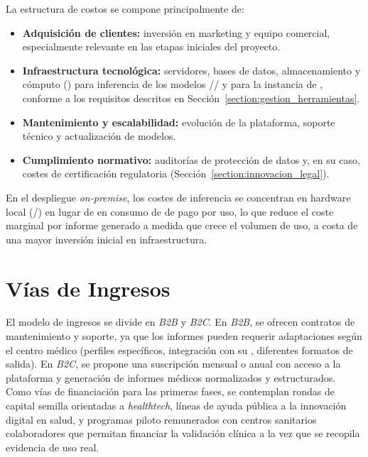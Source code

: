 La estructura de costos se compone principalmente de:

\begin{itemize}
    \item \textbf{Adquisición de clientes:} inversión en marketing y equipo comercial, especialmente
    relevante en las etapas iniciales del proyecto.
    \item \textbf{Infraestructura tecnológica:} servidores, bases de datos, almacenamiento y cómputo
    () para inferencia de los modelos //
    y para la instancia de , conforme a los requisitos descritos en
    Sección~\ref{section:gestion_herramientas}.
    \item \textbf{Mantenimiento y escalabilidad:} evolución de la plataforma, soporte técnico y
    actualización de modelos.
    \item \textbf{Cumplimiento normativo:} auditorías de protección de datos y, en su caso, costes de
    certificación regulatoria (Sección~\ref{section:innovacion_legal}).
\end{itemize}

En el despliegue \textit{on-premise}, los costes de inferencia se concentran en hardware local
(/) en lugar de en consumo de  de pago por uso, lo
que reduce el coste marginal por informe generado a medida que crece el volumen de uso, a costa de una
mayor inversión inicial en infraestructura.

\section{Vías de Ingresos}\label{section:innovacion_ingresos}

El modelo de ingresos se divide en \textit{B2B} y \textit{B2C}. En \textit{B2B}, se ofrecen contratos
de mantenimiento y soporte, ya que los informes pueden requerir adaptaciones según el centro médico
(perfiles  específicos, integración con su , diferentes formatos de salida).
En \textit{B2C}, se
propone una suscripción mensual o anual con acceso a la plataforma y generación de informes médicos
normalizados y estructurados. Como vías de financiación para las primeras fases, se contemplan rondas
de capital semilla orientadas a \textit{healthtech}, líneas de ayuda pública a la innovación digital en
salud, y programas piloto remunerados con centros sanitarios colaboradores que permitan financiar la
validación clínica a la vez que se recopila evidencia de uso real.


